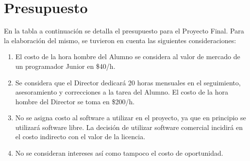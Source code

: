 \documentclass[12pt,bibliography=oldstyle,DIV=12,parskip=full-,titlepage]{scrartcl}
\begin{document}
\section{Presupuesto}
En la tabla a continuación se detalla el presupuesto para el Proyecto
Final. Para la elaboración del mismo, se tuvieron en cuenta las
siguientes consideraciones:
\begin{enumerate}
\item El costo de la hora hombre del Alumno se considera al valor de
  mercado de un programador Junior en \$40/h.
\item Se considera que el Director dedicará 20 horas mensuales en el
  seguimiento, asesoramiento y correcciones a la tarea del Alumno. El
  costo de la hora hombre del Director se toma en \$200/h.
\item No se asigna costo al software a utilizar en el proyecto, ya que
  en principio se utilizará software libre. La decisión de utilizar
  software comercial incidirá en el costo indirecto con el valor de la
  licencia.
\item No se consideran intereses así como
  tampoco el costo de oportunidad.
\end{enumerate}
\end{document}
